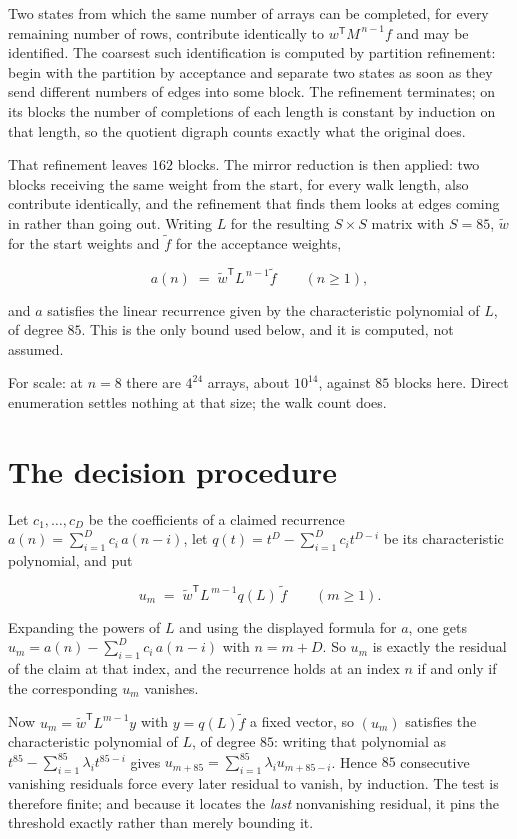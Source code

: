 \documentclass[11pt]{article}
\theoremstyle{definition}
\begin{document}
Two states from which the same number of arrays can be completed, for every remaining number of rows, contribute identically to $w^{\mathsf T}M^{\,n-1}f$ and may be identified. The coarsest such identification is computed by partition refinement: begin with the partition by acceptance and separate two states as soon as they send different numbers of edges into some block. The refinement terminates; on its blocks the number of completions of each length is constant by induction on that length, so the quotient digraph counts exactly what the original does.

That refinement leaves $162$ blocks. The mirror reduction is then applied: two blocks receiving the same weight from the start, for every walk length, also contribute identically, and the refinement that finds them looks at edges coming in rather than going out. Writing $L$ for the resulting $S \times S$ matrix with $S = 85$, $\tilde w$ for the start weights and $\tilde f$ for the acceptance weights,

\[a(n) \;=\; \tilde w^{\mathsf T} L^{\,n-1} \tilde f \qquad (n \ge 1),\]

and $a$ satisfies the linear recurrence given by the characteristic polynomial of $L$, of degree $85$. This is the only bound used below, and it is computed, not assumed.

For scale: at $n = 8$ there are $4^{24}$ arrays, about $10^{14}$, against $85$ blocks here. Direct enumeration settles nothing at that size; the walk count does.

\section{The decision procedure}

Let $c_1,\dots,c_D$ be the coefficients of a claimed recurrence $a(n) = \sum_{i=1}^{D} c_i\,a(n-i)$, let $q(t) = t^{D} - \sum_{i=1}^{D} c_i t^{D-i}$ be its characteristic polynomial, and put

\[u_m \;=\; \tilde w^{\mathsf T} L^{\,m-1} q(L)\,\tilde f \qquad (m \ge 1).\]

Expanding the powers of $L$ and using the displayed formula for $a$, one gets $u_m = a(n) - \sum_{i=1}^{D} c_i\,a(n-i)$ with $n = m + D$. So $u_m$ is exactly the residual of the claim at that index, and the recurrence holds at an index $n$ if and only if the corresponding $u_m$ vanishes.

Now $u_m = \tilde w^{\mathsf T} L^{m-1} y$ with $y = q(L)\tilde f$ a fixed vector, so $(u_m)$ satisfies the characteristic polynomial of $L$, of degree $85$: writing that polynomial as $t^{85} - \sum_{i=1}^{85} \lambda_i t^{85-i}$ gives $u_{m+85} = \sum_{i=1}^{85} \lambda_i u_{m+85-i}$. Hence $85$ consecutive vanishing residuals force every later residual to vanish, by induction. The test is therefore finite; and because it locates the {\itshape last} nonvanishing residual, it pins the threshold exactly rather than merely bounding it.
\end{document}

